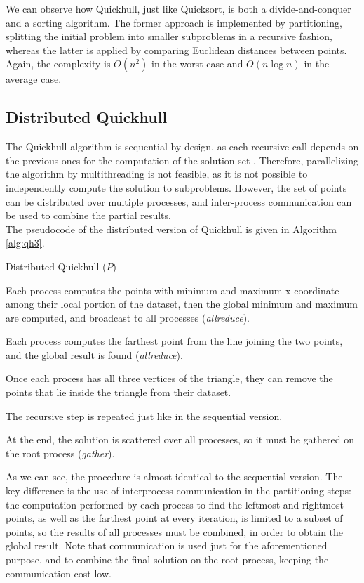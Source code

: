 \documentclass[]{finalproject}
\begin{document}
We can observe how Quickhull, just like Quicksort,
is both a divide-and-conquer and a sorting algorithm. The former approach is implemented by partitioning,
splitting the initial problem into smaller subproblems in a recursive fashion, whereas the latter is applied by comparing
Euclidean distances between points. Again, the complexity is $O(n^2)$ in the worst case and $O(n\log{n})$ in the average case.

\subsection{Distributed Quickhull}
The Quickhull algorithm is sequential by design,
as each recursive call depends on the previous ones for the computation of the solution set \cite{rameshconvex}.
Therefore, parallelizing the algorithm by multithreading is not feasible, as it is not possible to independently compute the solution to subproblems.
However, the set of points can be distributed over multiple processes, and inter-process communication can be used to combine the partial results.\\
The pseudocode of the distributed version of Quickhull is given in Algorithm \ref{alg:qh3}.

\begin{algorithm}
  \caption{Distributed Quickhull ($P$)}
  \label{alg:qh3}
  Each process computes the points with minimum and maximum x-coordinate among their local portion of the dataset, then the global minimum and maximum are computed, and broadcast to all processes (\textit{allreduce}).

  Each process computes the farthest point from the line joining the two points, and the global result is found (\textit{allreduce}).

  Once each process has all three vertices of the triangle, they can remove the points that lie inside the triangle from their dataset.

  The recursive step is repeated just like in the sequential version.

  At the end, the solution is scattered over all processes, so it must be gathered on the root process (\textit{gather}).
\end{algorithm}

As we can see, the procedure is almost identical to the sequential version.
The key difference is the use of interprocess communication in the partitioning steps:
the computation performed by each process to find the leftmost and rightmost points, as well as the farthest point at every iteration,
is limited to a subset of points, so the results of all processes must be combined, in order to obtain the global result.
Note that communication is used just for the aforementioned purpose, and to combine the final solution on the root process,
keeping the communication cost low.
\end{document}

